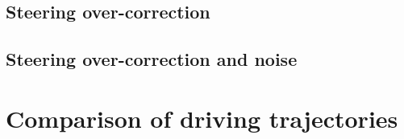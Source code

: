 

\subsection{Steering over-correction}



\subsection{Steering over-correction and noise}



\section{Comparison of driving trajectories}




